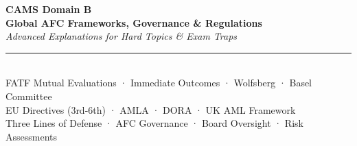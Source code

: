 \documentclass[12pt,aspectratio=169]{beamer}
\begin{document}
	
	\begin{frame}
		\centering
		\vspace{0.5cm}
		{\fontsize{18}{22}\selectfont \textbf{CAMS Domain B}}\\[0.15cm]
		{\fontsize{14}{17}\selectfont \textbf{Global AFC Frameworks, Governance \& Regulations}}\\[0.2cm]
		{\fontsize{9}{11}\selectfont \textit{Advanced Explanations for Hard Topics \& Exam Traps}}\\[0.1cm]
		\rule{4cm}{0.5pt}\\[0.1cm]
		{\fontsize{7}{9}\selectfont FATF Mutual Evaluations · Immediate Outcomes · Wolfsberg · Basel Committee}\\[0.05cm]
		{\fontsize{7}{9}\selectfont EU Directives (3rd-6th) · AMLA · DORA · UK AML Framework}\\[0.05cm]
		{\fontsize{7}{9}\selectfont Three Lines of Defense · AFC Governance · Board Oversight · Risk Assessments}
		\vspace{0.3cm}
	\end{frame}
	
\end{document}
